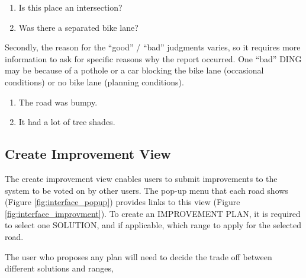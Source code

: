 \begin{enumerate}
  \item Is this place an intersection?
  \item Was there a separated bike lane?
\end{enumerate}

Secondly, the reason for the ``good'' / ``bad'' judgments varies, so it requires more information to
ask for specific reasons why the report occurred. One ``bad'' DING may be because of a pothole or a
car blocking the bike lane (occasional conditions) or no bike lane (planning conditions).

\begin{enumerate}
  \item The road was bumpy.
  \item It had a lot of tree shades.
\end{enumerate}

\subsection{Create Improvement View}

The create improvement view enables users to submit improvements to the system to be voted on by other users.
The pop-up menu that each road shows (Figure \ref{fig:interface_popup}) provides links to this view (Figure \ref{fig:interface_improvment}). 
To create an IMPROVEMENT PLAN, it is required to select one SOLUTION,
and if applicable, which range to apply for the selected road.

The user who proposes any plan will need to decide the trade off between different solutions and ranges, 



